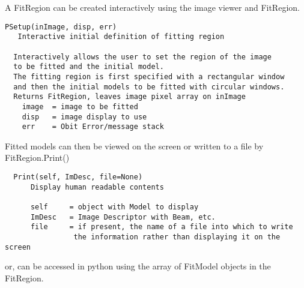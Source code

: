 \documentclass[11pt]{report}
\begin{document}
A FitRegion can be created interactively using the image viewer and
FitRegion.
\begin{verbatim}
PSetup(inImage, disp, err)
   Interactive initial definition of fitting region
        
  Interactively allows the user to set the region of the image
  to be fitted and the initial model.
  The fitting region is first specified with a rectangular window
  and then the initial models to be fitted with circular windows.
  Returns FitRegion, leaves image pixel array on inImage
    image  = image to be fitted
    disp   = image display to use
    err    = Obit Error/message stack

\end{verbatim}

Fitted models can then be viewed on the screen or written to a file by
FitRegion.Print()
\begin{verbatim}
  Print(self, ImDesc, file=None)
      Display human readable contents
      
      self     = object with Model to display
      ImDesc   = Image Descriptor with Beam, etc.
      file     = if present, the name of a file into which to write
                the information rather than displaying it on the screen
\end{verbatim}
or, can be accessed in python using the array of FitModel objects in
the FitRegion.
\end{document}
